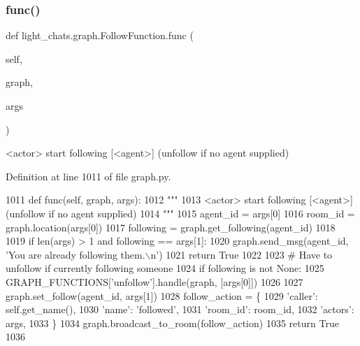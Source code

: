 \subsubsection{\texorpdfstring{func()}{func()}}
{\footnotesize\ttfamily def light\+\_\+chats.\+graph.\+Follow\+Function.\+func (\begin{DoxyParamCaption}\item[{}]{self,  }\item[{}]{graph,  }\item[{}]{args }\end{DoxyParamCaption})}

\begin{DoxyVerb}<actor> start following [<agent>] (unfollow if no agent supplied)
\end{DoxyVerb}
 

Definition at line 1011 of file graph.\+py.


\begin{DoxyCode}
1011     \textcolor{keyword}{def }func(self, graph, args):
1012         \textcolor{stringliteral}{"""}
1013 \textcolor{stringliteral}{        <actor> start following [<agent>] (unfollow if no agent supplied)}
1014 \textcolor{stringliteral}{        """}
1015         agent\_id = args[0]
1016         room\_id = graph.location(args[0])
1017         following = graph.get\_following(agent\_id)
1018 
1019         \textcolor{keywordflow}{if} len(args) > 1 \textcolor{keywordflow}{and} following == args[1]:
1020             graph.send\_msg(agent\_id, \textcolor{stringliteral}{'You are already following them.\(\backslash\)n'})
1021             \textcolor{keywordflow}{return} \textcolor{keyword}{True}
1022 
1023         \textcolor{comment}{# Have to unfollow if currently following someone}
1024         \textcolor{keywordflow}{if} following \textcolor{keywordflow}{is} \textcolor{keywordflow}{not} \textcolor{keywordtype}{None}:
1025             GRAPH\_FUNCTIONS[\textcolor{stringliteral}{'unfollow'}].handle(graph, [args[0]])
1026 
1027         graph.set\_follow(agent\_id, args[1])
1028         follow\_action = \{
1029             \textcolor{stringliteral}{'caller'}: self.get\_name(),
1030             \textcolor{stringliteral}{'name'}: \textcolor{stringliteral}{'followed'},
1031             \textcolor{stringliteral}{'room\_id'}: room\_id,
1032             \textcolor{stringliteral}{'actors'}: args,
1033         \}
1034         graph.broadcast\_to\_room(follow\_action)
1035         \textcolor{keywordflow}{return} \textcolor{keyword}{True}
1036 
\end{DoxyCode}
\mbox{\label{classlight__chats_1_1graph_1_1FollowFunction_a1421ab114b2675c3a138e6b005036022}} 
